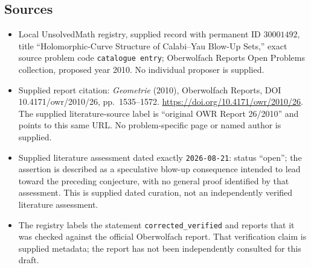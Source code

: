 \documentclass[11pt]{article}
\begin{document}
\subsection{Sources}
\begin{itemize}
\item Local UnsolvedMath registry, supplied record with permanent ID \(30001492\), title ``Holomorphic-Curve Structure of Calabi--Yau Blow-Up Sets,'' exact source problem code \texttt{catalogue entry}; Oberwolfach Reports Open Problems collection, proposed year 2010. No individual proposer is supplied.
\item Supplied report citation: \emph{Geometrie} (2010), Oberwolfach Reports, DOI 10.4171/owr/2010/26, pp.\ 1535--1572. \url{https://doi.org/10.4171/owr/2010/26}. The supplied literature-source label is ``original OWR Report 26/2010'' and points to this same URL. No problem-specific page or named author is supplied.
\item Supplied literature assessment dated exactly \texttt{2026-08-21}: status ``open''; the assertion is described as a speculative blow-up consequence intended to lead toward the preceding conjecture, with no general proof identified by that assessment. This is supplied dated curation, not an independently verified literature assessment.
\item The registry labels the statement \texttt{corrected\_verified} and reports that it was checked against the official Oberwolfach report. That verification claim is supplied metadata; the report has not been independently consulted for this draft.
\end{itemize}
\end{document}
